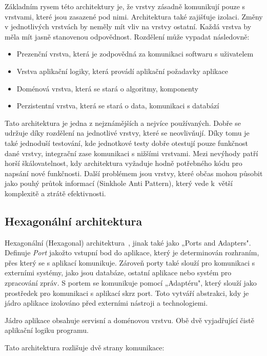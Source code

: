 Základním rysem této architektury je, že vrstvy zásadně komunikují pouze s vrstvami, které jsou zasazené pod nimi. Architektura také zajišťuje izolaci. Změny v jednotlivých vrstvách by neměly mít vliv na vrstvy ostatní. Každá vrstva by měla mít jasně stanovenou odpovědnost. Rozdělení může vypadat následovně:

\begin{itemize}
    \item Prezenční vrstva, která je zodpovědná za komunikaci softwaru s uživatelem
    \item Vrstva aplikační logiky, která provádí aplikační požadavky aplikace
    \item Doménová vrstva, která se stará o algoritmy, komponenty
    \item Perzistentní vrstva, která se stará o data, komunikaci s databází
\end{itemize}

Tato architektura je jedna z nejznámějších a nejvíce používaných. Dobře se udržuje díky rozdělení na jednotlivé vrstvy, které se neovlivňují. Díky tomu je také jednoduší testování, kde jednotkové testy dobře otestují pouze funkčnost dané vrstvy, integrační zase komunikaci s nižšími vrstvami.
Mezi nevýhody patří horší škálovatelnost, kdy architektura vyžaduje hodně potřebného kódu pro napsání nové funkčnosti. Další problémem jsou vrstvy, které občas mohou působit jako pouhý průtok informací (Sinkhole Anti Pattern)\cite{Layer2}, který vede k~větší komplexitě a ztrátě efektivnosti.

\subsection{Hexagonální architektura}

Hexagonální (Hexagonal) architektura~\cite{Hexagonal}, jinak také jako „Ports and Adapters". Definuje \textit{Port} jakožto vstupní bod do aplikace, který je determinován rozhraním, přes který se s aplikací komunikuje. Zároveň porty také slouží pro komunikaci s externími systémy, jako jsou databáze, ostatní aplikace nebo systém pro zpracování zpráv. S portem se komunikuje pomocí „Adaptéru", který slouží jako prostředek pro komunikaci s aplikací skrz port. Toto vytváří abstrakci, kdy je jádro aplikace izolováno před externími nástroji a technologiemi.

Jádro aplikace obsahuje servisní a doménovou vrstvu. Obě dvě vyjadřující čistě aplikační logiku programu.

Tato architektura rozlišuje dvě strany komunikace:

